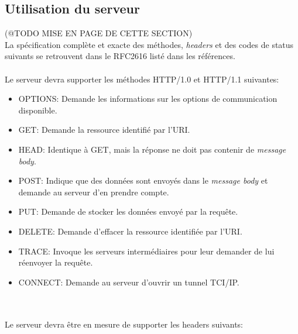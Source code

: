 \documentclass{scrreprt}
\begin{document}
\subsection{Utilisation du serveur}
(@TODO MISE EN PAGE DE CETTE SECTION)\\
La spécification complète et exacte des méthodes, \textit{headers} et des codes de status suivants se retrouvent dans le RFC2616 listé dans les références.\\\\
Le serveur devra supporter les méthodes HTTP/1.0 et HTTP/1.1 suivantes:\\
\begin{itemize}
 \item OPTIONS: Demande les informations sur les options de communication disponible.
 \item GET: Demande la ressource identifié par l'URI.
 \item HEAD: Identique à GET, mais la réponse ne doit pas contenir de \textit{message body}.
 \item POST: Indique que des données sont envoyés dans le \textit{message body} et demande au serveur d'en prendre compte.
 \item PUT: Demande de stocker les données envoyé par la requête.
 \item DELETE: Demande d'effacer la ressource identifiée par l'URI.
 \item TRACE: Invoque les serveurs intermédiaires pour leur demander de lui réenvoyer la requête.
 \item CONNECT: Demande au serveur d'ouvrir un tunnel TCI/IP.
 \\
\end{itemize}
\\\\
Le serveur devra être en mesure de supporter les headers suivants: \\

\\
\end{document}
